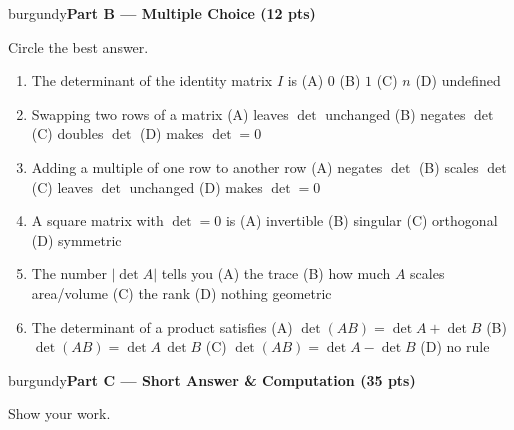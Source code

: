 \documentclass[10pt]{article}
\newcommand{\parthead}[1]{%
  \vspace{6pt}\noindent
  \begin{headlinebox}{burgundy}{\color{white}\bfseries #1}\end{headlinebox}%
  \vspace{4pt}}
\begin{document}
\parthead{Part B --- Multiple Choice (12 pts)}
Circle the best answer.

\begin{enumerate}[leftmargin=1.9em, itemsep=9pt]
  \item The determinant of the identity matrix $I$ is
    \hfill (A) $0$ \quad (B) $1$ \quad (C) $n$ \quad (D) undefined
  \item Swapping two rows of a matrix
    \hfill (A) leaves $\det$ unchanged \quad (B) negates $\det$ \quad (C) doubles $\det$ \quad (D) makes $\det=0$
  \item Adding a multiple of one row to another row
    \hfill (A) negates $\det$ \quad (B) scales $\det$ \quad (C) leaves $\det$ unchanged \quad (D) makes $\det=0$
  \item A square matrix with $\det=0$ is
    \hfill (A) invertible \quad (B) singular \quad (C) orthogonal \quad (D) symmetric
  \item The number $|\det A|$ tells you
    \hfill (A) the trace \quad (B) how much $A$ scales area/volume \quad (C) the rank \quad (D) nothing geometric
  \item The determinant of a product satisfies
    \hfill (A) $\det(AB)=\det A+\det B$ \quad (B) $\det(AB)=\det A\,\det B$ \quad (C) $\det(AB)=\det A-\det B$ \quad (D) no rule
\end{enumerate}

\parthead{Part C --- Short Answer \& Computation (35 pts)}
Show your work.
\end{document}
